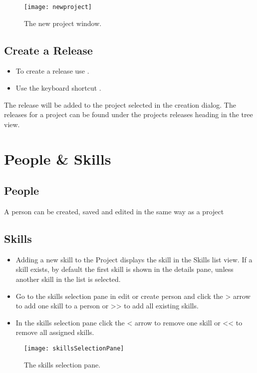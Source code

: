 \documentclass[11pt,fleqn]{book} %
\begin{document}
    \begin{figure}[h]
        \centering
        \texttt{[image: newproject]}
        \caption{The new project window.\label{newproject}}
    \end{figure}

\subsection{Create a Release}
    \begin{itemize}
        \item To create a release use .
        \item Use the keyboard shortcut .
    \end{itemize}
    The release will be added to the project selected in the creation dialog.
    The releases for a project can be found under the projects releases heading in the tree view.

\section{People \& Skills}
\subsection{People}
A person can be created, saved and edited in the same way as a project
\subsection{Skills}
\begin{itemize}
  \item Adding a new skill to the Project displays the skill in the Skills list view. If a skill exists, by default the
  first skill is shown in the details pane, unless another skill in the list is selected.
  \item Go to the skills selection pane in edit or create person and click the > arrow to add one skill to a person
  or >> to add all existing skills.
  \item In the skills selection pane click the < arrow to remove one skill or << to remove all assigned skills.
\end{itemize}

\begin{figure}[H]
  \centering
  \texttt{[image: skillsSelectionPane]}
  \caption{The skills selection pane.\label{skillsSelectionPane}}
\end{figure}
\end{document}
